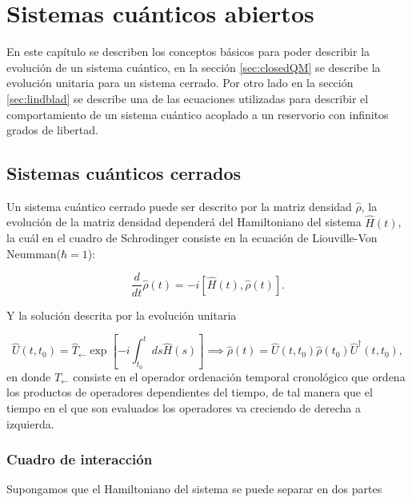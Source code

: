 
\chapter{Sistemas cuánticos abiertos}

En este capítulo se describen los conceptos básicos para poder describir la evolución de un sistema cuántico, en la sección \ref{sec:closedQM} se describe la evolución unitaria para un sistema cerrado.  Por otro lado en la sección \ref{sec:lindblad} se describe una de las ecuaciones utilizadas para describir el comportamiento de un sistema cuántico acoplado a un reservorio con infinitos grados de libertad.


\section{Sistemas cuánticos cerrados}
Un sistema cuántico cerrado puede ser descrito por la matriz densidad $\hat{\rho}$, la evolución de la matriz densidad dependerá del Hamiltoniano del sistema $\hat{H}(t)$, la cuál en el cuadro de Schrodinger consiste en la ecuación de Liouville-Von Neumman($\hbar = 1$)\cite{breuer2002theory}:

\begin{equation*}
    \frac{d}{dt}\hat{\rho}(t) = -i[\hat{H}(t),\hat{\rho}(t)].
\end{equation*}

Y la solución descrita por la evolución unitaria 

\begin{equation*}
    \hat{U}(t,t_{0}) = \hat{T}_{\leftarrow} \exp \left[ -i \int_{t_{0}}^{t}ds \hat{H}(s) \right] \implies \hat{\rho}(t) = \hat{U}(t,t_{0})\hat{\rho}(t_{0})\hat{U}^{\dagger}(t,t_{0}),
\end{equation*}
en donde $\hat{T}_{\leftarrow}$ consiste en el operador ordenación temporal cronológico que ordena los productos de operadores dependientes del tiempo, de tal manera que el tiempo en el que son evaluados los operadores va creciendo de derecha a izquierda.

\subsection{Cuadro de interacción}
Supongamos que el Hamiltoniano del sistema se puede separar en dos partes

